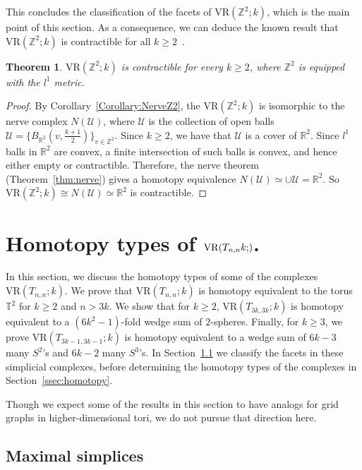 \documentclass[12pt,a4paper]{amsart}
\newtheorem{theorem}{Theorem}[section]
\theoremstyle{definition}
\newcommand{\R}{\ensuremath{\mathbb{R}}}
\newcommand{\T}{\ensuremath{\mathbb{T}}}
\newcommand{\Z}{\ensuremath{\mathbb{Z}}}
\newcommand{\cU}{\ensuremath{\mathcal{U}}}
\newcommand{\vr}[2]{\mathrm{VR}(#1;#2)}
\numberwithin{equation}{section}
\begin{document}
This concludes the classification of the facets of $\vr{\Z^2}{k}$, which is the main point of this section.
As a consequence, we can deduce the known result that $\vr{\Z^2}{k}$ is contractible for all $k\ge 2$~\cite{zaremsky2024contractible,373007,wang2024contractibilityvietorisripscomplexesdense,virk2024contractibility}.

\begin{theorem}
\label{Theorem:MaximalSimplices}
$\vr{\Z^2}{k}$ is contractible for every $k\geq 2$, where $\Z^2$ is equipped with the $l^1$ metric.
\end{theorem}

\begin{proof}
By Corollary~\ref{Corollary:NerveZ2}, the $\vr{\Z^2}{k}$ is isomorphic to the nerve complex $N(\cU)$, where $\cU$ is the collection of open balls $\cU=\{B_{\R^2}(v,\frac{k+1}{2})\}_{v\in \Z^2}$.
Since $k\ge 2$, we have that $\cU$ is a cover of $\R^2$.
Since $l^1$ balls in $\R^2$ are convex, a finite intersection of such balls is convex, and hence either empty or contractible.
Therefore, the nerve theorem (Theorem~\ref{thm:nerve}) gives a homotopy equivalence $N(\cU) \simeq \cup\cU = \R^2$.
So $\vr{\Z^2}{k}\cong N(\cU) \simeq \R^2$ is contractible.
\end{proof}



\section{
Homotopy types of $\vr{T_{n,n}{k}}$.
}
\label{sec:wedgeS2S3}

In this section, we discuss the homotopy types of some of the complexes $\vr{T_{n,n}}{k}$.
We prove that $\vr{T_{n,n}}{k}$ is homotopy equivalent to the torus $\T^2$ for $k\ge 2$ and $n>3k$.
We show that for $k\geq 2$, $\vr{T_{3k,3k}}{k}$ is homotopy equivalent to a $(6k^2-1)$-fold wedge sum of $2$-spheres.
Finally, for $k\geq 3$, we prove $\vr{T_{3k-1,3k-1}}{k}$ is homotopy equivalent to a wedge sum of $6k-3$ many $S^2$'s and $6k-2$ many $S^3$'s.
In Section~\ref{ssec:maximal} we classify the facets in these simplicial complexes, before determining the homotopy types of the complexes in Section~\ref{ssec:homotopy}.

Though we expect some of the results in this section to have analogs for grid graphs in higher-dimensional tori, we do not pursue that direction here.

\subsection{Maximal simplices}
\label{ssec:maximal}
\end{document}
